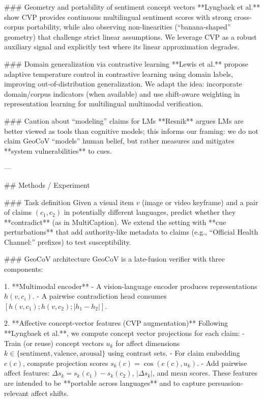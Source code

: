 ### Geometry and portability of sentiment concept vectors  
**Lyngbaek et al.** show CVP provides continuous multilingual sentiment scores with strong cross-corpus portability, while also observing non-linearities (“banana-shaped” geometry) that challenge strict linear assumptions. We leverage CVP as a robust auxiliary signal and explicitly test where its linear approximation degrades.

### Domain generalization via contrastive learning  
**Lewis et al.** propose adaptive temperature control in contrastive learning using domain labels, improving out-of-distribution generalization. We adapt the idea: incorporate domain/corpus indicators (when available) and use shift-aware weighting in representation learning for multilingual multimodal verification.

### Caution about “modeling” claims for LMs  
**Resnik** argues LMs are better viewed as tools than cognitive models; this informs our framing: we do not claim GeoCoV “models” human belief, but rather measures and mitigates **system vulnerabilities** to cues.

---

## Methods / Experiment  

### Task definition  
Given a visual item \(v\) (image or video keyframe) and a pair of claims \((c_1, c_2)\) in potentially different languages, predict whether they **contradict** (as in MultiCaption). We extend the setting with **cue perturbations** that add authority-like metadata to claims (e.g., “Official Health Channel:” prefixes) to test susceptibility.

### GeoCoV architecture  
GeoCoV is a late-fusion verifier with three components:

1. **Multimodal encoder**  
- A vision-language encoder produces representations \(h(v, c_i)\).  
- A pairwise contradiction head consumes \([h(v,c_1); h(v,c_2); |h_1-h_2|]\).

2. **Affective concept-vector features (CVP augmentation)**  
Following **Lyngbaek et al.**, we compute concept vector projections for each claim:  
- Train (or reuse) concept vectors \(u_k\) for affect dimensions \(k \in \{\text{sentiment}, \text{valence}, \text{arousal}\}\) using contrast sets.  
- For claim embedding \(e(c)\), compute projection scores \(s_k(c)=\cos(e(c), u_k)\).  
- Add pairwise affect features: \(\Delta s_k = s_k(c_1)-s_k(c_2)\), \(|\Delta s_k|\), and mean scores.  
These features are intended to be **portable across languages** and to capture persuasion-relevant affect shifts.

